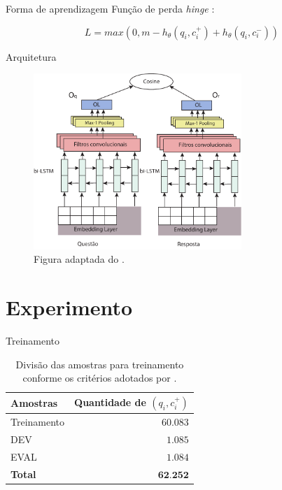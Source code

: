 \documentclass[10pt]{beamer}
\begin{document}
\begin{frame}{Forma de aprendizagem}
	Função de perda \textit{hinge} \cite{tan-lstm-qa, Gu-deep-code-search:2018}:
	
    \begin{equation}
    L = max(0, m - h_{\theta}(q_{i}, c_{i}^{+}) + h_{\theta}(q_{i}, c_{i}^{-}))   
    \end{equation}
\end{frame}





\begin{frame}{Arquitetura}
	\begin{figure}[h]
    \centering
    \includegraphics[width=0.7\textwidth]{ArquiteturaBiLSTM.pdf}
    \caption{Figura adaptada do \cite{tan-lstm-qa}.}
    \label{fig:arquitetura-bi-lstm}
\end{figure}
\end{frame}


\section{Experimento}

\begin{frame}[fragile]{Treinamento}
      \begin{table}[h]
\centering
\begin{tabular}{ p{3cm} r  }
 \hline
 \textbf{Amostras} & \textbf{Quantidade de $(q_{i}, c_{i}^{+})$}\\
 \hline
 Treinamento & $60.083$\\
 
 DEV & $1.085$ \\
 
 EVAL & $1.084$\\
 \hline
 \textbf{Total} & $\textbf{62.252}$\\
 \hline
\end{tabular}
\caption{Divisão das amostras para treinamento conforme os critérios adotados por \cite{iyer-etal-2016-summarizing}.}
\label{table:divisao-amostras}
\end{table}
\end{frame}
\end{document}
